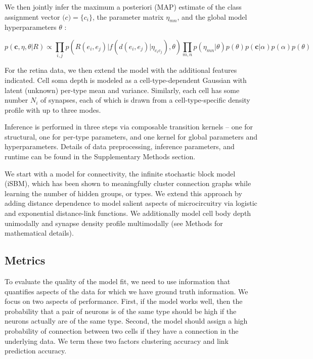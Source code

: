 \documentclass{article}
\renewcommand{\vec}[1]{\mathbf{#1}}
\begin{document}
We then jointly infer the maximum a posteriori (MAP) estimate of the
class assignment vector $\vec(c) = \{c_i\}$, the parameter matrix
$\eta_{mn}$, and the global model hyperparameters $\theta$ :

\begin{equation}
  p(\vec{c}, \eta, \theta | R ) \propto \prod_{i, j} p(R(e_i, e_j) | f(d(e_i, e_j) | \eta_{c_ic_j}), \theta) \prod_{m, n} p(\eta_{mn} | \theta)  p(\theta) p(\vec{c} | \alpha) p(\alpha) p(\theta)
\end{equation}

For the retina data, we then extend the model with the additional
features indicated. Cell soma depth is modeled as a
cell-type-dependent Gaussian with latent (unknown) per-type mean and
variance. Similarly, each cell has some number $N_i$ of synapses, 
each of which is drawn from a cell-type-specific density profile
with up to three modes.

Inference is performed in three steps via composable transition 
kernels -- one for structural, one for per-type parameters, and
one kernel for global parameters and hyperparameters. Details
of data preprocessing, inference parameters, and runtime can
be found in the Supplementary Methods section. 


We start with a model for connectivity, the infinite stochastic block
model (iSBM)\autocite{Kemp2006a,Xu2006}, which has been shown to
meaningfully cluster connection graphs while learning the number of
hidden groups, or types. We extend this approach by adding distance
dependence to model salient aspects of microcircuitry via logistic and
exponential distance-link functions.  We additionally model cell body
depth unimodally and synapse density profile multimodally (see
Methods for mathematical details).


\subsection{Metrics}
To evaluate the quality of the model fit, we need to use information that quantifies aspects of the data for which we have ground truth information. We focus on two aspects of performance. First, if the model works well, then the probability that a pair of neurons is of the same type should be high if the neurons actually are of the same type. Second, the model should assign a high probability of connection between two cells if they have a connection in the underlying data. We term these two factors clustering accuracy and link prediction accuracy.
\end{document}
